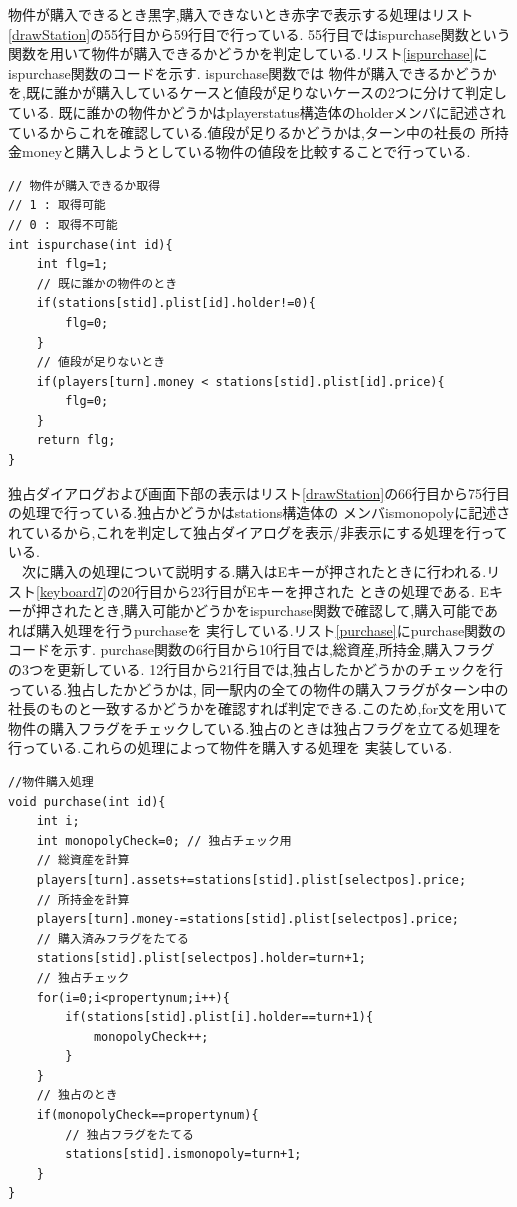 \documentclass[a4j]{jarticle}
\begin{document}
    物件が購入できるとき黒字,購入できないとき赤字で表示する処理はリスト\ref{drawStation}の55行目から59行目で行っている. 55行目ではispurchase関数という
    関数を用いて物件が購入できるかどうかを判定している.リスト\ref{ispurchase}にispurchase関数のコードを示す. ispurchase関数では
    物件が購入できるかどうかを,既に誰かが購入しているケースと値段が足りないケースの2つに分けて判定している.
    既に誰かの物件かどうかはplayerstatus構造体のholderメンバに記述されているからこれを確認している.値段が足りるかどうかは,ターン中の社長の
    所持金moneyと購入しようとしている物件の値段を比較することで行っている.
    \begin{lstlisting}[basicstyle=\ttfamily\footnotesize, frame=single,label=ispurchase,caption=ispurchase関数]
// 物件が購入できるか取得
// 1 : 取得可能
// 0 : 取得不可能
int ispurchase(int id){
    int flg=1;
    // 既に誰かの物件のとき
    if(stations[stid].plist[id].holder!=0){
        flg=0;
    }
    // 値段が足りないとき
    if(players[turn].money < stations[stid].plist[id].price){ 
        flg=0;
    }
    return flg;
}
    \end{lstlisting} 

    独占ダイアログおよび画面下部の表示はリスト\ref{drawStation}の66行目から75行目の処理で行っている.独占かどうかはstations構造体の
    メンバismonopolyに記述されているから,これを判定して独占ダイアログを表示/非表示にする処理を行っている.\\
    　次に購入の処理について説明する.購入はEキーが押されたときに行われる.リスト\ref{keyboard7}の20行目から23行目がEキーを押された
    ときの処理である. Eキーが押されたとき,購入可能かどうかをispurchase関数で確認して,購入可能であれば購入処理を行うpurchaseを
    実行している.リスト\ref{purchase}にpurchase関数のコードを示す. purchase関数の6行目から10行目では,総資産,所持金,購入フラグ
    の3つを更新している. 12行目から21行目では,独占したかどうかのチェックを行っている.独占したかどうかは,
    同一駅内の全ての物件の購入フラグがターン中の社長のものと一致するかどうかを確認すれば判定できる.このため,for文を用いて
    物件の購入フラグをチェックしている.独占のときは独占フラグを立てる処理を行っている.これらの処理によって物件を購入する処理を
    実装している.
    \begin{lstlisting}[basicstyle=\ttfamily\footnotesize, frame=single,label=purchase,caption=purchase関数]
//物件購入処理
void purchase(int id){
    int i;
    int monopolyCheck=0; // 独占チェック用
    // 総資産を計算
    players[turn].assets+=stations[stid].plist[selectpos].price;
    // 所持金を計算
    players[turn].money-=stations[stid].plist[selectpos].price;
    // 購入済みフラグをたてる
    stations[stid].plist[selectpos].holder=turn+1;    
    // 独占チェック
    for(i=0;i<propertynum;i++){
        if(stations[stid].plist[i].holder==turn+1){
            monopolyCheck++;
        }
    }    
    // 独占のとき
    if(monopolyCheck==propertynum){
        // 独占フラグをたてる
        stations[stid].ismonopoly=turn+1;
    }    
}
    \end{lstlisting} 
    
\end{document}
